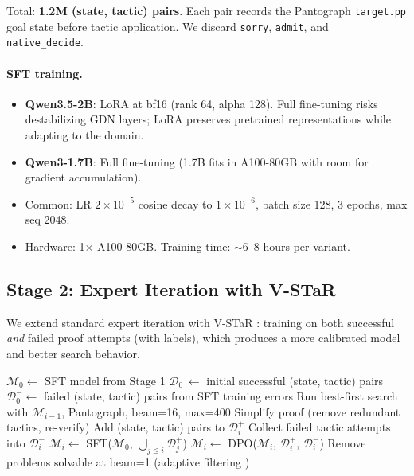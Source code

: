 \documentclass[11pt,a4paper]{article}
\begin{document}
Total: \textbf{1.2M (state, tactic) pairs}. Each pair records the Pantograph \texttt{target.pp} goal state before tactic application. We discard \texttt{sorry}, \texttt{admit}, and \texttt{native\_decide}.

\paragraph{SFT training.}
\begin{itemize}
\item \textbf{Qwen3.5-2B}: LoRA at bf16 (rank 64, alpha 128). Full fine-tuning risks destabilizing GDN layers; LoRA preserves pretrained representations while adapting to the domain.
\item \textbf{Qwen3-1.7B}: Full fine-tuning (1.7B fits in A100-80GB with room for gradient accumulation).
\item Common: LR $2 \times 10^{-5}$ cosine decay to $1 \times 10^{-6}$, batch size 128, 3 epochs, max seq 2048.
\item Hardware: 1$\times$ A100-80GB. Training time: $\sim$6--8 hours per variant.
\end{itemize}

\subsection{Stage 2: Expert Iteration with V-STaR}
\label{sec:stage2}

We extend standard expert iteration \citep{expertiteration} with V-STaR \citep{vstar}: training on both successful \emph{and} failed proof attempts (with labels), which produces a more calibrated model and better search behavior.

\begin{algorithm}
\caption{Expert Iteration with V-STaR and Proof Simplification}
\begin{algorithmic}[1]
\STATE $\mathcal{M}_0 \leftarrow$ SFT model from Stage 1
\STATE $\mathcal{D}_0^+ \leftarrow$ initial successful (state, tactic) pairs
\STATE $\mathcal{D}_0^- \leftarrow$ failed (state, tactic) pairs from SFT training errors
    \STATE Run best-first search with $\mathcal{M}_{i-1}$, Pantograph, beam=16, max=400
      \STATE Simplify proof (remove redundant tactics, re-verify)
      \STATE Add (state, tactic) pairs to $\mathcal{D}_i^+$
    \ENDIF
    \STATE Collect failed tactic attempts into $\mathcal{D}_i^-$
  \ENDFOR
  \STATE $\mathcal{M}_i \leftarrow$ SFT($\mathcal{M}_0$, $\bigcup_{j \leq i} \mathcal{D}_j^+$)
  \STATE $\mathcal{M}_i \leftarrow$ DPO($\mathcal{M}_i$, $\mathcal{D}_i^+$, $\mathcal{D}_i^-$) 
  \STATE Remove problems solvable at beam=1 (adaptive filtering \citep{bfsprover2})
\ENDFOR
\end{algorithmic}
\end{algorithm}
\end{document}
